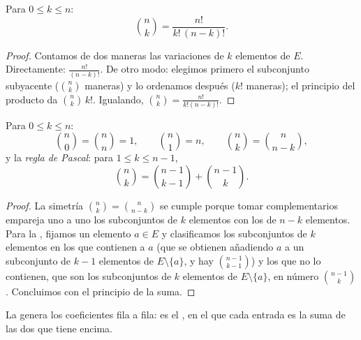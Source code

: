\begin{theorem}\label{thm:g12:comb:binomformula}
Para $0 \leq k \leq n$:
\[
\binom{n}{k} = \frac{n!}{k!\,(n-k)!} .
\]
\end{theorem}

\begin{proof}
Contamos de dos maneras las variaciones de $k$ elementos de $E$.
Directamente: $\frac{n!}{(n-k)!}$. De otro modo: elegimos primero el
subconjunto subyacente ($\binom nk$ maneras) y lo ordenamos después ($k!$
maneras); el principio del producto da $\binom{n}{k}\,k!$. Igualando,
$\binom nk = \frac{n!}{k!(n-k)!}$.
\end{proof}

\begin{proposition}\label{prop:g12:comb:identities}
Para $0 \leq k \leq n$:
\[
\binom{n}{0} = \binom{n}{n} = 1, \qquad
\binom{n}{1} = n, \qquad
\binom{n}{k} = \binom{n}{n-k},
\]
y la \emph{regla de Pascal}: para
$1 \leq k \leq n-1$,
\[
\binom{n}{k} = \binom{n-1}{k-1} + \binom{n-1}{k}.
\]
\end{proposition}

\begin{proof}
La simetría $\binom nk = \binom{n}{n-k}$ se cumple porque tomar
complementarios empareja uno a uno los subconjuntos de $k$ elementos con los
de $n-k$ elementos. Para la , fijamos un elemento $a \in E$ y
clasificamos los subconjuntos de $k$ elementos en los que contienen a $a$
(que se obtienen añadiendo $a$ a un subconjunto de $k-1$ elementos de
$E \setminus \{a\}$, y hay $\binom{n-1}{k-1}$) y los que no lo contienen,
que son los subconjuntos de $k$ elementos de $E \setminus \{a\}$, en número
$\binom{n-1}{k}$. Concluimos con el principio de la suma.
\end{proof}

La  genera los coeficientes fila a fila: es el
\emph{}, en el que cada entrada es la suma de las dos que
tiene encima.

